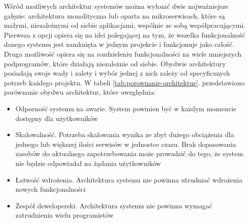 \documentclass[11pt, a4]{article} %
\begin{document}
Wśród możliwych architektur systemów można wyłonić dwie najważniejsze gałęzie: 
architektura monolityczna lub oparta na mikroserwisach, które są małymi, niezależnymi 
od siebie aplikacjami, wspólnie ze sobą współpracującymi. Pierwsza z opcji opiera się 
na idei polegającej na tym, że wszelka funkcjonalność danego systemu jest zamknięta 
w jednym projekcie i funkcjonuje jako całość. Druga możliwość opiera się na 
rozdzieleniu funkcjonalności na wiele mniejszych podprogramów, które działają 
niezależnie od siebie. Obydwie architektury posiadają swoje wady i zalety i wybór 
jednej z nich zależy od specyficznych potrzeb każdego projektu. W tabeli 
\ref{tab:porownanie-architektur}. przedstawiono porównanie obydwu architektur, które 
uwzględnia:

\begin{itemize} %
    \item Odporność systemu na awarie. System powinien być w każdym momencie dostępny 
    dla użytkowników
    \item Skalowalność. Potrzeba skalowania wynika ze zbyt dużego obciążenia dla jednego 
    lub większej ilości serwisów w jednostce czasu. Brak dopasowania zasobów do 
    aktualnego zapotrzebowania może prowadzić do tego, że system nie będzie odpowiadał 
    na żądania użytkowników
    \item Łatwość wdrożenia. Architektura systemu nie powinna utrudniać wdrożenia nowych 
    funkcjonalności
    \item Zespół deweloperski. Architektura systemu nie powinna wymagać zatrudnienia 
    wielu programistów
\end{itemize}
\end{document}
